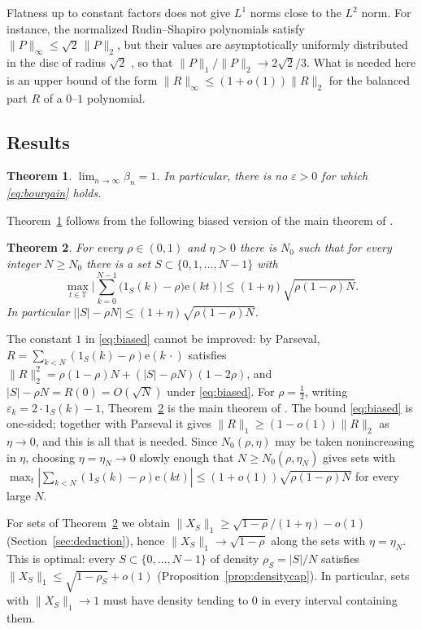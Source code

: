 \documentclass[11pt,reqno]{amsart}
\newtheorem{theorem}{Theorem}[section]
\theoremstyle{definition}
\newcommand{\T}{\mathbb{T}}
\newcommand{\e}{\mathrm{e}}
\begin{document}
Flatness up to constant factors does not give $L^1$ norms close to the $L^2$ norm. For instance, the normalized Rudin--Shapiro polynomials satisfy $\|P\|_\infty\le\sqrt2\,\|P\|_2$, but their values are asymptotically uniformly distributed in the disc of radius $\sqrt2$ \cite{Rod17}, so that $\|P\|_1/\|P\|_2\to2\sqrt2/3$. What is needed here is an upper bound of the form $\|R\|_\infty\le(1+o(1))\|R\|_2$ for the balanced part $R$ of a $0$--$1$ polynomial.

\subsection{Results}

\begin{theorem}\label{thm:negative}
$\lim_{n\to\infty}\beta_n=1$. In particular, there is no $\varepsilon>0$ for which \eqref{eq:bourgain} holds.
\end{theorem}

Theorem~\ref{thm:negative} follows from the following biased version of the main theorem of \cite{AMM}.

\begin{theorem}\label{thm:biased}
For every $\rho\in(0,1)$ and $\eta>0$ there is $N_0$ such that for every integer $N\ge N_0$ there is a set $S\subset\{0,1,\dots,N-1\}$ with
\begin{equation}\label{eq:biased}
\max_{t\in\T}\Big|\sum_{k=0}^{N-1}\big(1_S(k)-\rho\big)\e(kt)\Big|\le(1+\eta)\sqrt{\rho(1-\rho)N}.
\end{equation}
In particular $\big||S|-\rho N\big|\le(1+\eta)\sqrt{\rho(1-\rho)N}$.
\end{theorem}

The constant $1$ in \eqref{eq:biased} cannot be improved: by Parseval, $R=\sum_{k<N}(1_S(k)-\rho)\e(k\,\cdot)$ satisfies $\|R\|_2^2=\rho(1-\rho)N+(|S|-\rho N)(1-2\rho)$, and $|S|-\rho N=R(0)=O(\sqrt N)$ under \eqref{eq:biased}. For $\rho=\frac12$, writing $\varepsilon_k=2\cdot1_S(k)-1$, Theorem~\ref{thm:biased} is the main theorem of \cite{AMM}. The bound \eqref{eq:biased} is one-sided; together with Parseval it gives $\|R\|_1\ge(1-o(1))\|R\|_2$ as $\eta\to0$, and this is all that is needed. Since $N_0(\rho,\eta)$ may be taken nonincreasing in $\eta$, choosing $\eta=\eta_N\to0$ slowly enough that $N\ge N_0(\rho,\eta_N)$ gives sets with $\max_t|\sum_{k<N}(1_S(k)-\rho)\e(kt)|\le(1+o(1))\sqrt{\rho(1-\rho)N}$ for every large $N$.

For sets of Theorem~\ref{thm:biased} we obtain $\|X_S\|_1\ge\sqrt{1-\rho}/(1+\eta)-o(1)$ (Section~\ref{sec:deduction}), hence $\|X_S\|_1\to\sqrt{1-\rho}$ along the sets with $\eta=\eta_N$. This is optimal: every $S\subset\{0,\dots,N-1\}$ of density $\rho_S=|S|/N$ satisfies $\|X_S\|_1\le\sqrt{1-\rho_S}+o(1)$ (Proposition~\ref{prop:densitycap}). In particular, sets with $\|X_S\|_1\to1$ must have density tending to $0$ in every interval containing them.
\end{document}
